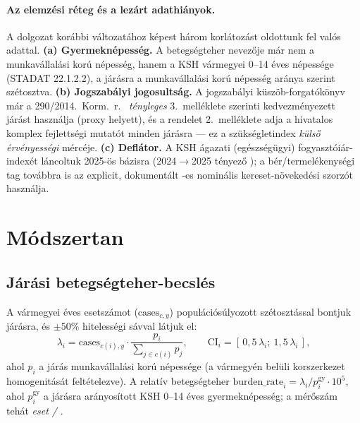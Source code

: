 \documentclass[11pt,a4paper]{article}
\begin{document}
\paragraph{Az elemzési réteg és a lezárt adathiányok.}
A dolgozat korábbi változatához képest három korlátozást oldottunk fel valós
adattal. \textbf{(a) Gyermeknépesség.} A betegségteher nevezője már nem a
munkavállalási korú népesség, hanem a KSH vármegyei 0--14 éves népessége
(STADAT 22.1.2.2), a járásra a munkavállalási korú népesség aránya szerint
szétosztva. \textbf{(b) Jogszabályi jogosultság.} A jogszabályi
küszöb-forgatókönyv már a 290/2014.~Korm.~r.\ \citep{korm2902014}
\emph{tényleges} 3.~melléklete szerinti \nEligibleProxy{} kedvezményezett
járást használja (proxy helyett), és a rendelet 2.~melléklete adja a
hivatalos komplex fejlettségi mutatót minden járásra --- ez a szükségletindex
\emph{külső érvényességi} mércéje. \textbf{(c) Deflátor.} A KSH ágazati
(egészségügyi) fogyasztóiár-indexét láncoltuk 2025-ös bázisra
(2024$\to$2025 tényező ); a bér/termelékenységi tag továbbra is az
explicit, dokumentált \earningsDefl-es nominális kereset-növekedési szorzót
használja.

\section{Módszertan}

\subsection{Járási betegségteher-becslés}
A vármegyei éves esetszámot ($\mathrm{cases}_{c,y}$) populációsúlyozott
szétosztással bontjuk járásra, és $\pm 50\%$ hitelességi sávval látjuk el:
\begin{equation}
\lambda_i = \mathrm{cases}_{c(i),y}\cdot
  \frac{p_i}{\sum_{j\in c(i)} p_j},\qquad
\mathrm{CI}_i = [\,0{,}5\,\lambda_i;\ 1{,}5\,\lambda_i\,],
\end{equation}
ahol $p_i$ a járás munkavállalási korú népessége (a vármegyén belüli
korszerkezet homogenitását feltételezve). A relatív betegségteher
$\mathrm{burden\_rate}_i = \lambda_i / p^{\text{gy}}_i \cdot 10^5$, ahol
$p^{\text{gy}}_i$ a járásra arányosított KSH 0--14 éves gyermeknépesség; a
mérőszám tehát \emph{eset / \rateDenom{}}.
\end{document}
